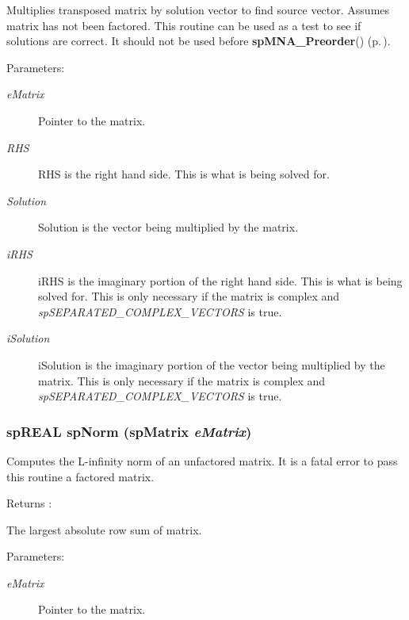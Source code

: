 Multiplies transposed matrix by solution vector to find source vector. Assumes matrix has not been factored. This routine can be used as a test to see if solutions are correct. It should not be used before {\bf sp\-MNA\_\-Preorder}() {\rm (p.\,\pageref{spUtils_8c_a11})}.\begin{Desc}
\item[Parameters: ]\par
\begin{description}
\item[{\em 
e\-Matrix}]Pointer to the matrix. \item[{\em 
RHS}]RHS is the right hand side. This is what is being solved for. \item[{\em 
Solution}]Solution is the vector being multiplied by the matrix. \item[{\em 
i\-RHS}]i\-RHS is the imaginary portion of the right hand side. This is what is being solved for. This is only necessary if the matrix is complex and {\em sp\-SEPARATED\_\-COMPLEX\_\-VECTORS} is true. \item[{\em 
i\-Solution}]i\-Solution is the imaginary portion of the vector being multiplied by the matrix. This is only necessary if the matrix is complex and {\em sp\-SEPARATED\_\-COMPLEX\_\-VECTORS} is true. \end{description}
\end{Desc}
\subsubsection{\setlength{\rightskip}{0pt plus 5cm}sp\-REAL sp\-Norm ({\bf sp\-Matrix} {\em e\-Matrix})}\label{spUtils_8c_a21}


Computes the L-infinity norm of an unfactored matrix. It is a fatal error to pass this routine a factored matrix.

\begin{Desc}
\item[Returns :]\par
 The largest absolute row sum of matrix.\end{Desc}
\begin{Desc}
\item[Parameters: ]\par
\begin{description}
\item[{\em 
e\-Matrix}]Pointer to the matrix. \end{description}
\end{Desc}
